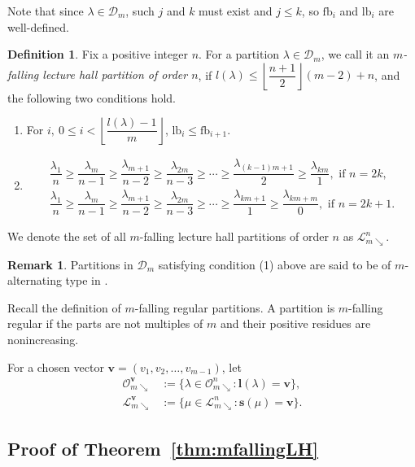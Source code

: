 \documentclass[11pt,reqno]{amsart}
\numberwithin{equation}{section}
\theoremstyle{plain}
\theoremstyle{definition}
\newtheorem{Def}[theorem]{Definition}
\newtheorem{remark}[theorem]{Remark}
\newcommand{\D}{\mathcal{D}}
\newcommand{\OO}{\mathcal{O}}
\newcommand{\sbf}{\mathbf{s}}
\newcommand{\lbf}{\mathbf{l}}
\newcommand{\vbf}{\mathbf{v}}
\newcommand{\LL}{\mathcal{L}}
\def\fb{\mathrm{fb}}
\def\lb{\mathrm{lb}}
\begin{document}
Note that since $\lambda\in\D_m$, such $j$ and $k$ must exist and $j\le k$, so $\fb_i$ and $\lb_i$ are well-defined.

\begin{Def}\label{m-falling LH}
Fix a positive integer $n$. For a partition $\lambda\in\D_m$, we call it an \emph{$m$-falling lecture hall partition of order $n$}, if $l(\lambda)\le \left\lfloor\dfrac{n+1}{2}\right\rfloor(m-2)+n$, and the following two conditions hold.
\begin{enumerate}
	
	\item For $i,\:0\le i<\left\lfloor\dfrac{l(\lambda)-1}{m}\right\rfloor$, $\lb_i\le \fb_{i+1}$.
	\item \begin{align*}
	\dfrac{\lambda_1}{n}\ge\dfrac{\lambda_m}{n-1}\ge\dfrac{\lambda_{m+1}}{n-2}\ge\dfrac{\lambda_{2m}}{n-3}\ge\cdots\ge\dfrac{\lambda_{(k-1)m+1}}{2}\ge\dfrac{\lambda_{km}}{1}, \text{ if $n=2k$,}\\
	\dfrac{\lambda_1}{n}\ge\dfrac{\lambda_m}{n-1}\ge\dfrac{\lambda_{m+1}}{n-2}\ge\dfrac{\lambda_{2m}}{n-3}\ge\cdots\ge\dfrac{\lambda_{km+1}}{1}\ge\dfrac{\lambda_{km+m}}{0}, \text{ if $n=2k+1$.}
	\end{align*}
\end{enumerate}
We denote the set of all $m$-falling lecture hall partitions of order $n$ as $\LL_{m\searrow}^n$.
\end{Def}
\begin{remark}
Partitions in $\D_m$ satisfying condition (1) above are said to be of $m$-alternating type in \cite{Kei-the}.
\end{remark}

Recall  the definition of $m$-falling regular partitions. A partition is $m$-falling regular if the parts are not multiples of $m$ and their positive residues are nonincreasing.

For a chosen vector $\vbf=(v_1,v_2,\ldots,v_{m-1})$, let
\begin{align*}
\OO_{m\searrow}^{\vbf}&:=\{\lambda\in\OO_{m\searrow}^n:\lbf(\lambda)=\vbf\},\\
\LL_{m\searrow}^{\vbf}&:=\{\mu\in\LL_{m\searrow}^{n}:\sbf(\mu)=\vbf\}.
\end{align*}




\subsection{Proof of Theorem~\ref{thm:mfallingLH}}
\end{document}
